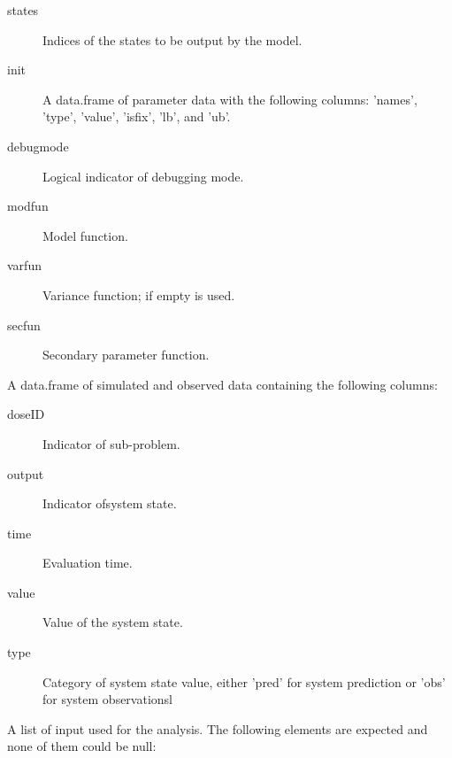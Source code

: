 \begin{Arguments}
\begin{ldescription}
\begin{description}
\begin{description}
\end{description}

\item[states] Indices of the states to be output by the model.
\item[init] A data.frame of parameter data with the following columns:
'names', 'type', 'value', 'isfix', 'lb', and 'ub'.
\item[debugmode] Logical indicator of debugging mode.
\item[modfun] Model function.
\item[varfun] Variance function; if empty  is
used.
\item[secfun] Secondary parameter function.

\end{description}


\item[\code{Fsim}] A data.frame of simulated and observed data containing the
following columns:\begin{description}

\item[doseID] Indicator of sub-problem.
\item[output] Indicator ofsystem state.
\item[time] Evaluation time.
\item[value] Value of the system state.
\item[type] Category of system state value, either 'pred' for system
prediction or 'obs' for system observationsl

\end{description}


\item[\code{files}] A list of input used for the analysis. The following elements are
expected and none of them could be null: \begin{description}


\end{description}
\end{ldescription}
\end{Arguments}
